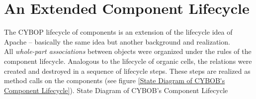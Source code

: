 \section{An Extended Component Lifecycle}

The CYBOP lifecycle of components is an extension of the lifecycle idea of Apache
-- basically the same idea but another background and realization.\\
All \emph{whole-part associations} between objects were organized
under the rules of the component lifecycle. Analogous to the
lifecycle of organic cells, the relations were created and
destroyed in a sequence of lifecycle steps. These steps are
realized as method calls on the components (see figure \ref{State
Diagram of CYBOB's Component Lifecycle}).
 {State Diagram of CYBOB's Component Lifecycle}
